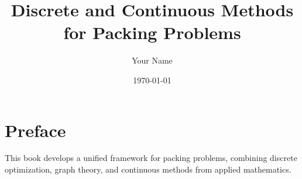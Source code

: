 \documentclass[11pt,oneside]{book}
\title{\textbf{Discrete and Continuous Methods for Packing Problems}}
\author{Your Name}
\date{\today}
\theoremstyle{plain}
\theoremstyle{definition}
\theoremstyle{remark}
\begin{document}
\frontmatter

\maketitle

\tableofcontents

\chapter*{Preface}

This book develops a unified framework for packing problems,
combining discrete optimization, graph theory, and continuous
methods from applied mathematics.


\mainmatter








\backmatter



\end{document}
